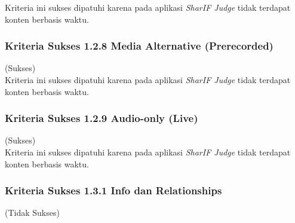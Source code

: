 Kriteria ini sukses dipatuhi karena pada aplikasi \textit{SharIF Judge} tidak terdapat konten berbasis waktu.

\subsubsection{Kriteria Sukses 1.2.8 Media Alternative (Prerecorded)}
\label{subsubsec:kepatuhan_kriteria_1.2.8}
(Sukses) \\

Kriteria ini sukses dipatuhi karena pada aplikasi \textit{SharIF Judge} tidak terdapat konten berbasis waktu.

\subsubsection{Kriteria Sukses 1.2.9 Audio-only (Live)}
\label{subsubsec:kepatuhan_kriteria_1.2.9}
(Sukses) \\

Kriteria ini sukses dipatuhi karena pada aplikasi \textit{SharIF Judge} tidak terdapat konten berbasis waktu.

\subsubsection{Kriteria Sukses 1.3.1 Info dan Relationships}
\label{subsubsec:kepatuhan_kriteria_1.3.1}
(Tidak Sukses) \\

